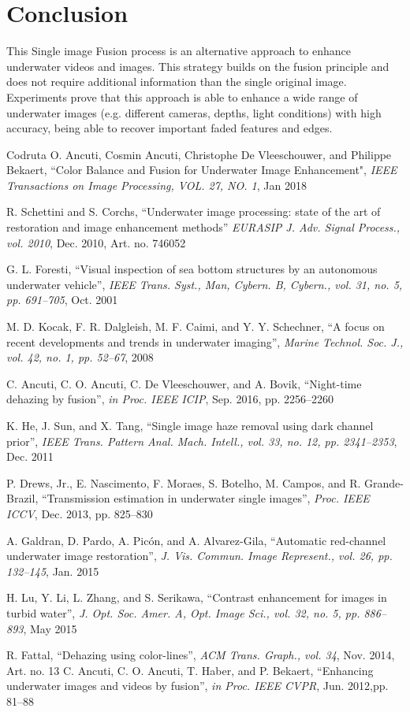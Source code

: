 \documentclass[hidelinks, 12pt]{report}
\begin{document}
\chapter{Conclusion}
This Single image Fusion process is an alternative approach to enhance underwater videos and images. This strategy builds on the fusion principle and does not require additional information than the single original image. Experiments prove that this approach is able to enhance a wide range
of underwater images (e.g. different cameras, depths, light conditions) with high accuracy, being able to recover important faded features and edges.
\pagebreak
\begin{thebibliography}{11}
Codruta O. Ancuti, Cosmin Ancuti, Christophe De Vleeschouwer, and Philippe Bekaert, ``Color Balance and Fusion for Underwater Image Enhancement", \textit{IEEE Transactions on Image Processing, VOL. 27, NO. 1}, Jan 2018

 R. Schettini and S. Corchs, ``Underwater image processing: state of the art of restoration and image enhancement methods” \textit{EURASIP J. Adv. Signal Process., vol. 2010}, Dec. 2010, Art. no. 746052 

 G. L. Foresti, ``Visual inspection of sea bottom structures by an autonomous underwater vehicle”, \textit{IEEE Trans. Syst., Man, Cybern. B, Cybern., vol. 31, no. 5, pp. 691–705}, Oct. 2001

 M. D. Kocak, F. R. Dalgleish, M. F. Caimi, and Y. Y. Schechner, ``A focus on recent developments and trends in underwater imaging”, \textit{Marine Technol. Soc. J., vol. 42, no. 1, pp. 52–67}, 2008

 C. Ancuti, C. O. Ancuti, C. De Vleeschouwer, and A. Bovik, ``Night-time dehazing by fusion”, \textit{in Proc. IEEE ICIP}, Sep. 2016, pp. 2256–2260

 K. He, J. Sun, and X. Tang, ``Single image haze removal using dark channel prior”, \textit{IEEE Trans. Pattern Anal. Mach. Intell., vol. 33, no. 12, pp. 2341–2353}, Dec. 2011

 P. Drews, Jr., E. Nascimento, F. Moraes, S. Botelho, M. Campos, and R. Grande-Brazil, ``Transmission estimation in underwater single images”, \textit{Proc. IEEE ICCV}, Dec. 2013, pp. 825–830

 A. Galdran, D. Pardo, A. Picón, and A. Alvarez-Gila, ``Automatic red-channel underwater image restoration”, \textit{J. Vis. Commun. Image Represent., vol. 26, pp. 132–145}, Jan. 2015

 H. Lu, Y. Li, L. Zhang, and S. Serikawa, ``Contrast enhancement for images in turbid water”, \textit{J. Opt. Soc. Amer. A, Opt. Image Sci., vol. 32, no. 5, pp. 886–893}, May 2015

 R. Fattal, ``Dehazing using color-lines”, \textit{ACM Trans. Graph., vol. 34}, Nov. 2014, Art. no. 13
 C. Ancuti, C. O. Ancuti, T. Haber, and P. Bekaert, ``Enhancing underwater images and videos by fusion”, \textit{in Proc. IEEE CVPR}, Jun. 2012,pp. 81–88

\end{thebibliography}
\end{document}
